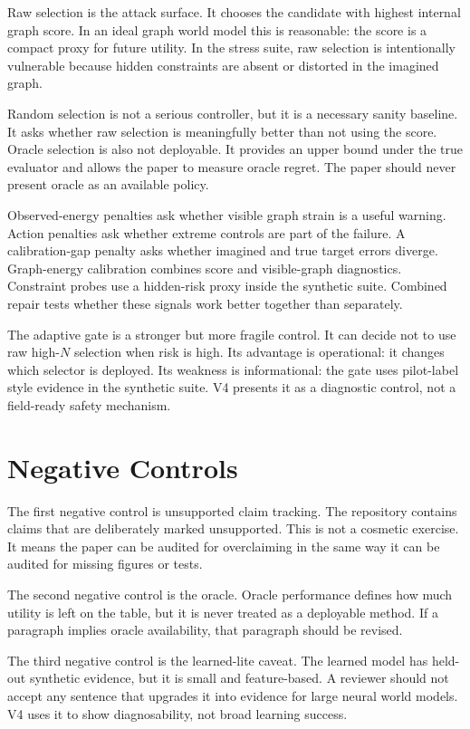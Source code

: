 \documentclass{article}
\begin{document}
Raw selection is the attack surface.  It chooses the candidate with highest
internal graph score.  In an ideal graph world model this is reasonable: the
score is a compact proxy for future utility.  In the stress suite, raw selection
is intentionally vulnerable because hidden constraints are absent or distorted
in the imagined graph.

Random selection is not a serious controller, but it is a necessary sanity
baseline.  It asks whether raw selection is meaningfully better than not using
the score.  Oracle selection is also not deployable.  It provides an upper bound
under the true evaluator and allows the paper to measure oracle regret.  The
paper should never present oracle as an available policy.

Observed-energy penalties ask whether visible graph strain is a useful warning.
Action penalties ask whether extreme controls are part of the failure.  A
calibration-gap penalty asks whether imagined and true target errors diverge.
Graph-energy calibration combines score and visible-graph diagnostics.
Constraint probes use a hidden-risk proxy inside the synthetic suite.  Combined
repair tests whether these signals work better together than separately.

The adaptive gate is a stronger but more fragile control.  It can decide not to
use raw high-\(N\) selection when risk is high.  Its advantage is operational:
it changes which selector is deployed.  Its weakness is informational: the gate
uses pilot-label style evidence in the synthetic suite.  V4 presents it as a
diagnostic control, not a field-ready safety mechanism.

\section{Negative Controls}

The first negative control is unsupported claim tracking.  The repository
contains claims that are deliberately marked unsupported.  This is not a
cosmetic exercise.  It means the paper can be audited for overclaiming in the
same way it can be audited for missing figures or tests.

The second negative control is the oracle.  Oracle performance defines how much
utility is left on the table, but it is never treated as a deployable method.
If a paragraph implies oracle availability, that paragraph should be revised.

The third negative control is the learned-lite caveat.  The learned model has
held-out synthetic evidence, but it is small and feature-based.  A reviewer
should not accept any sentence that upgrades it into evidence for large neural
world models.  V4 uses it to show diagnosability, not broad learning success.
\end{document}
